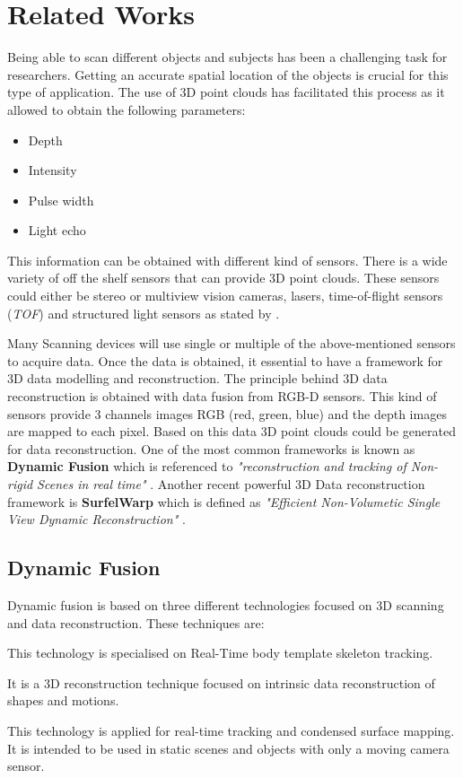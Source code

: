 \documentclass[12pt]{report}
\begin{document}
\chapter{Related Works}
Being able to scan different objects and subjects has been a challenging task for researchers. Getting an accurate spatial location of the objects is crucial for this type of application.
The use of 3D point clouds has facilitated this process as it allowed to obtain the following parameters:
\begin{itemize}[]
  \itemsep0em 
  \item Depth
  \item Intensity
  \item Pulse width
  \item Light echo
\end{itemize}
This information can be obtained with different kind of sensors. There is a wide variety of off the shelf sensors that can provide 3D point clouds. 
These sensors could either be stereo or multiview vision cameras, lasers, time-of-flight sensors (\textit{TOF}) and structured light sensors as stated by .

Many Scanning devices will use single or multiple of the above-mentioned sensors to acquire data. Once the data is obtained, it essential to have a framework for 3D data modelling and reconstruction.
The principle behind 3D data reconstruction is obtained with data fusion from RGB-D sensors. This kind of sensors provide 3 channels images RGB (red, green, blue) and the depth images are mapped to each pixel. Based on this data 3D point clouds could be generated for data reconstruction.
One of the most common frameworks is known as \textbf{Dynamic Fusion} which is referenced to \textit{"reconstruction and tracking of Non-rigid Scenes in real time"} .
Another recent powerful 3D Data reconstruction framework is \textbf{SurfelWarp} which is defined as \textit{"Efficient Non-Volumetic Single View Dynamic Reconstruction"} .

\section{Dynamic Fusion}
Dynamic fusion is based on three different technologies focused on 3D scanning and data reconstruction. These techniques are: 

\begin{description}[style=nextline]
  \item[DART (Dense Articulated Real-Time Tracking)] This technology is specialised on Real-Time body template skeleton tracking.
  \item[Animation Cartography] It is a 3D reconstruction technique focused on intrinsic data reconstruction of shapes and motions. 
  \item[Kinect Fusion] This technology is applied for real-time tracking and condensed surface mapping. It is intended to be used in static scenes and objects with only a moving camera sensor. 
\end{description} 
\end{document}
